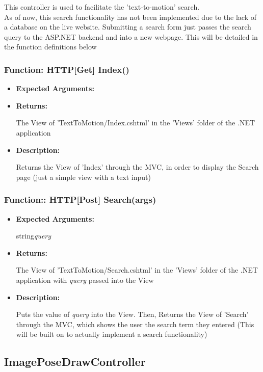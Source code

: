 \documentclass{scrreprt}
\begin{document}
This controller is used to facilitate the 'text-to-motion' search.
\\
As of now, this search functionality has not been implemented due to the lack of a database on the live website. Submitting a search form just passes the search query to the ASP.NET backend and into a new webpage. This will be detailed in the function definitions below

\subsubsection{Function: HTTP[Get] Index()}
\begin{itemize}
    \item \textbf{Expected Arguments:}
    \item \textbf{Returns:}

    The View of 'TextToMotion/Index.cshtml' in the 'Views' folder of the .NET application

    \item \textbf{Description:}

    Returns the View of 'Index' through the MVC, in order to display the Search page (just a simple view with a text input)
\end{itemize}


\subsubsection{Function:: HTTP[Post] Search(args)}
\begin{itemize}
    \item \textbf{Expected Arguments:}

    string\quad\textit{query}

    \item \textbf{Returns:}

    The View of 'TextToMotion/Search.cshtml' in the 'Views' folder of the .NET application with \textit{query} passed into the View

    \item \textbf{Description:}

    Puts the value of \textit{query} into the View. Then, Returns the View of 'Search' through the MVC, which shows the user the search term they entered (This will be built on to actually implement a search functionality)

\end{itemize}


\subsection{ImagePoseDrawController}
\end{document}
